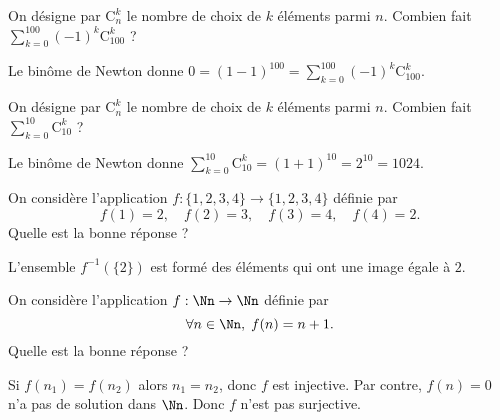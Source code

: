 \begin{question}

On désigne par $\mathrm{C}^k_n$ le nombre de choix de $k$ éléments parmi $n$. Combien fait $\displaystyle \sum _{k=0}^{100}(-1)^k\mathrm{C}^k_{100}$ ?
\begin{answers}  
\end{answers}
\begin{explanations}
Le binôme de Newton donne $\displaystyle 0=(1-1)^{100}=\sum _{k=0}^{100}(-1)^k\mathrm{C}^k_{100}$.
\end{explanations}
\end{question}

\begin{question}

On désigne par $\mathrm{C}^k_n$ le nombre de choix de $k$ éléments parmi $n$. Combien fait $\displaystyle \sum _{k=0}^{10}\mathrm{C}^k_{10}$ ?
\begin{answers}  
\end{answers}
\begin{explanations}
Le binôme de Newton donne $\displaystyle \sum _{k=0}^{10}\mathrm{C}^k_{10}=(1+1)^{10}=2^{10}=1024$.
\end{explanations}
\end{question}


\begin{question}

On considère l'application $f:\{1,2,3,4\}\to \{1,2,3,4\}$ définie par
$$f(1)=2,\quad f(2)=3,\quad f(3)=4,\quad f(4)=2.$$
Quelle est la bonne réponse ?
\begin{answers}  
\end{answers}
\begin{explanations}
L'ensemble $f^{-1}(\{2\})$ est formé des éléments qui ont une image égale à $2$.
\end{explanations}
\end{question}


\begin{question}

On considère l'application $f:\Nn\to \Nn$ définie par
$$\forall n\in \Nn,\; f(n)=n+1.$$
Quelle est la bonne réponse ?
\begin{answers}  
\end{answers}
\begin{explanations}
Si $f(n_1)=f(n_2)$ alors $n_1=n_2$, donc $f$ est injective. Par contre, $f(n)=0$ n'a pas de solution dans $\Nn$. Donc $f$ n'est pas surjective.
\end{explanations}
\end{question}


